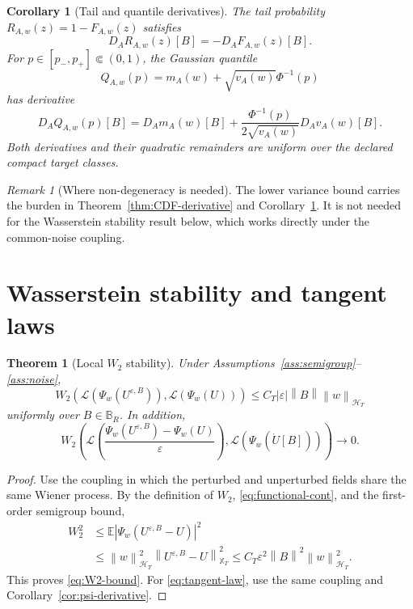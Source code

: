 \documentclass[11pt]{article}
\newtheorem{theorem}[assumption]{Theorem}
\newtheorem{corollary}[assumption]{Corollary}
\theoremstyle{remark}
\newtheorem{remark}[assumption]{Remark}
\newcommand{\E}{\mathbb E}
\newcommand{\cH}{\mathcal H_T}
\newcommand{\cX}{\mathbb X_T}
\newcommand{\Ph}{\Phi}
\newcommand{\norm}[1]{\left\lVert #1\right\rVert}
\newcommand{\abs}[1]{\left\lvert #1\right\rvert}
\newcommand{\Law}{\mathcal L}
\begin{document}
\begin{corollary}[Tail and quantile derivatives]\label{cor:tail-quantile}
The tail probability $R_{A,w}(z)=1-F_{A,w}(z)$ satisfies
\[
 D_AR_{A,w}(z)[B]=-D_AF_{A,w}(z)[B].
\]
For $p\in[p_-,p_+]\Subset(0,1)$, the Gaussian quantile
\begin{equation}\label{eq:quantile}
 Q_{A,w}(p)
 =m_A(w)+\sqrt{v_A(w)}\Ph^{-1}(p)
\end{equation}
has derivative
\begin{equation}\label{eq:DQ}
 D_AQ_{A,w}(p)[B]
 =D_Am_A(w)[B]
 +\frac{\Ph^{-1}(p)}{2\sqrt{v_A(w)}}D_Av_A(w)[B].
\end{equation}
Both derivatives and their quadratic remainders are uniform over the declared compact target classes.
\end{corollary}

\begin{remark}[Where non-degeneracy is needed]
The lower variance bound carries the burden in Theorem~\ref{thm:CDF-derivative} and Corollary~\ref{cor:tail-quantile}. It is not needed for the Wasserstein stability result below, which works directly under the common-noise coupling.
\end{remark}

\section{Wasserstein stability and tangent laws}

\begin{theorem}[Local $W_2$ stability]\label{thm:W2}
Under Assumptions~\ref{ass:semigroup}--\ref{ass:noise},
\begin{equation}\label{eq:W2-bound}
 W_2\left(
 \Law(\Psi_w(U^{\varepsilon,B})),
 \Law(\Psi_w(U))
 \right)
 \le
 C_T\abs{\varepsilon}\norm{B}\norm{w}_{\cH}
\end{equation}
uniformly over $B\in\mathbb B_R$. In addition,
\begin{equation}\label{eq:tangent-law}
 W_2\left(
 \Law\left(
 \frac{\Psi_w(U^{\varepsilon,B})-\Psi_w(U)}{\varepsilon}
 \right),
 \Law(\Psi_w(\dot U[B]))
 \right)
 \longrightarrow0.
\end{equation}
\end{theorem}

\begin{proof}
Use the coupling in which the perturbed and unperturbed fields share the same Wiener process. By the definition of $W_2$, \eqref{eq:functional-cont}, and the first-order semigroup bound,
\begin{align*}
 W_2^2
 &\le
 \E\abs{\Psi_w(U^{\varepsilon,B}-U)}^2\\
 &\le
 \norm{w}_{\cH}^2
 \norm{U^{\varepsilon,B}-U}_{\cX}^2
 \le C_T\varepsilon^2\norm{B}^2\norm{w}_{\cH}^2.
\end{align*}
This proves \eqref{eq:W2-bound}. For \eqref{eq:tangent-law}, use the same coupling and Corollary~\ref{cor:psi-derivative}.
\end{proof}
\end{document}
